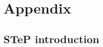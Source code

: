 \appendix
\onecolumn
\section{Appendix}
\subsection{STeP introduction}
\label{sec:step-appdix}
\begin{figure}[htb]


\end{figure}

